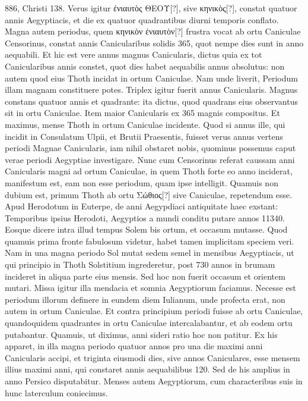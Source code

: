 886, Christi 138.
Verus igitur \textgreek{ἐνιαυτὸς ΘΕΟΥ}[?], sive \textgreek{κηνικὸς}[?],
constat quatuor annis Aegyptiacis, et die ex quatuor quadrantibus
diurni temporis conflato.
Magna autem periodus, quem \textgreek{κηνικὸν
ἐνιαυτὸν}[?] frustra vocat ab  ortu Caniculae Censorinus,
 constat annis Canicularibus
solidis 365, quot nempe dies sunt in anno aequabili.
Et hic est vere annus magnus Canicularis,
 dictus quia ex tot Canicularibus
annis constet, quot dies habet aequabilis annus absolutus:
non autem quod eius Thoth incidat in ortum Caniculae.
Nam
unde liverit, Periodum illam magnam constituere potes.
Triplex
igitur fuerit annus Canicularis.
Magnus constans quatuor annis et
quadrante: ita dictus, quod quadrans eius observantus sit in ortu Caniculae.
Item maior Canicularis ex 365 magnis compositus.
Et maximus, mense Thoth in ortum Caniculae incidente.
Quod si annus
ille, qui incidit in Consulatum Ulpii, et Brutii Praesentis, fuisset verus
annus vertens periodi Magnae Canicularis, iam nihil obstaret
nobis, quominus possemus caput verae periodi Aegyptiae investigare.
Nunc cum Censorinus referat caussam anni Canicularis
magni ad ortum Caniculae, in quem Thoth forte eo anno inciderat,
manifestum est, eam non esse periodum, quam ipse intelligit.
Quamuis non dubium est, primum Thoth ab ortu \textgreek{Σώθιος}[?] sive
Caniculae, repetendum esse.
Apud Herodotum in Euterpe, de anni
Aegypdiaci antiquitate haec exstant: Temporibus ipsius Herodoti,
Aegyptios a mundi conditu putare annos 11340.
Eosque dicere intra
illud tempus Solem bis ortum, et occasum mutasse.
Quod quamuis
prima fronte fabulosum videtur, habet tamen implicitam speciem
veri.
%
Nam in una magna periodo Sol mutat sedem semel in mensibus
Aegyptiacis, ut qui principio in Thoth Solstitium ingrederetur,
post 730 annos in brumam incideret in aliqua parte eius mensis.
Sed
hoc non fuerit occasum et orientem mutari.
Missa igitur illa mendacia et somnia
Aegyptiorum faciamus.
Necesse est periodum
illorum definere in eundem diem Iulianum,
unde profecta erat, non autem in
ortum Caniculae.
Et contra principium
periodi fuisse ab ortu Caniculae, quandoquidem
quadrantes in ortu Caniculae intercalabantur,
et ab eodem ortu putabantur.
Quamuis, ut diximus, anni sideri ratio
hoc non patitur.
Ex his apparet, in
illa magna periodo quatuor annos pro
una die maximi anni Canicularis accipi,
et triginta eiusmodi dies, sive annos Caniculares,
esse mensem illius maximi anni, qui constaret annis aequabilibus
120.
Sed de his amplius in anno Persico disputabitur.
Menses autem Aegyptiorum, cum characteribus suis in hunc laterculum
coniecimus.
%
